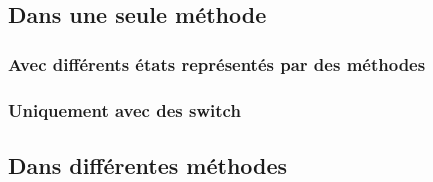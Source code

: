 \subsection{Dans une seule méthode}

\subsubsection{Avec différents états représentés par des méthodes}




\clearpage
\subsubsection{Uniquement avec des switch}



\clearpage
\subsection{Dans différentes méthodes}




